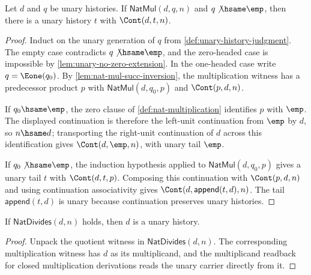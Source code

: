 \begin{lemma}
\label{lem:natmul-nonempty-quotient-product-extension}
Let $d$ and $q$ be unary histories. If $\mathsf{NatMul}(d,q,n)$ and $q\not\hsame\emp$, then there is a unary history $t$ with $\Cont(d,t,n)$.
\end{lemma}
\begin{proof}
Induct on the unary generation of $q$ from \autoref{def:unary-history-judgment}. The empty case contradicts $q\not\hsame\emp$, and the zero-headed case is impossible by \autoref{lem:unary-no-zero-extension}. In the one-headed case write $q=\Eone(q_0)$. By \autoref{lem:nat-mul-succ-inversion}, the multiplication witness has a predecessor product $p$ with $\mathsf{NatMul}(d,q_0,p)$ and $\Cont(p,d,n)$.

If $q_0\hsame\emp$, the zero clause of \autoref{def:nat-multiplication} identifies $p$ with $\emp$. The displayed continuation is therefore the left-unit continuation from $\emp$ by $d$, so $n\hsame d$; transporting the right-unit continuation of $d$ across this identification gives $\Cont(d,\emp,n)$, with unary tail $\emp$.

If $q_0\not\hsame\emp$, the induction hypothesis applied to $\mathsf{NatMul}(d,q_0,p)$ gives a unary tail $t$ with $\Cont(d,t,p)$. Composing this continuation with $\Cont(p,d,n)$ and using continuation associativity gives $\Cont(d,\mathsf{append}(t,d),n)$. The tail $\mathsf{append}(t,d)$ is unary because continuation preserves unary histories.
\end{proof}

\begin{lemma}
\label{lem:nat-divides-divisor-unary}
If $\mathsf{NatDivides}(d,n)$ holds, then $d$ is a unary history.
\end{lemma}
\begin{proof}
Unpack the quotient witness in \(\mathsf{NatDivides}(d,n)\). The
corresponding multiplication witness has \(d\) as its multiplicand, and
the multiplicand readback for closed multiplication derivations reads the
unary carrier directly from it.
\end{proof}

